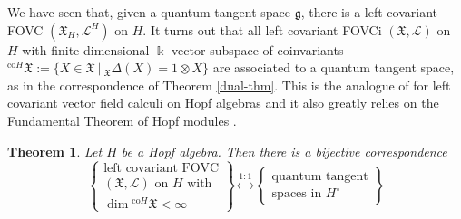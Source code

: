 \documentclass{article}
\newtheorem{theorem}[thm]{Theorem}
\theoremstyle{definition}
\begin{document}
	{We have seen that, given a quantum tangent space $\mathfrak{g}$, there is a left covariant FOVC $(\mathfrak{X}_H,\mathscr{L}^H)$ on $H$. It turns out that all left covariant FOVCi $(\mathfrak{X},\mathscr{L})$ on $H$ with finite-dimensional $\Bbbk$-vector subspace of coinvariants ${}^{\mathrm{co}H}\mathfrak{X}:=\{X\in\mathfrak{X}~|~{}_\mathfrak{X}\Delta(X)=1\otimes X\}$ are associated to a quantum tangent space, as in the correspondence of Theorem \ref{dual-thm}. This is the analogue of \cite[Theorem 1.5]{Woronowicz1989} for left covariant vector field calculi on Hopf algebras and it also greatly relies on the Fundamental Theorem of Hopf modules \cite[Theorem~1.9.4]{mont}.}
	\begin{theorem}\label{thm:leftcov=qts}
		Let $H$ be a Hopf algebra. Then there is a bijective correspondence
		\begin{equation}
			\begin{Bmatrix}
				\text{left covariant FOVC}\\
				(\mathfrak{X},\mathscr{L})\text{ on $H$ with }\\
				\dim{}^{\mathrm{co}H}\mathfrak{X}<\infty
			\end{Bmatrix}\overset{1:1}{\longleftrightarrow}\begin{Bmatrix}
				\text{quantum tangent}\\
				\text{spaces in }H^\circ
			\end{Bmatrix}
		\end{equation}
	\end{theorem}
\end{document}
